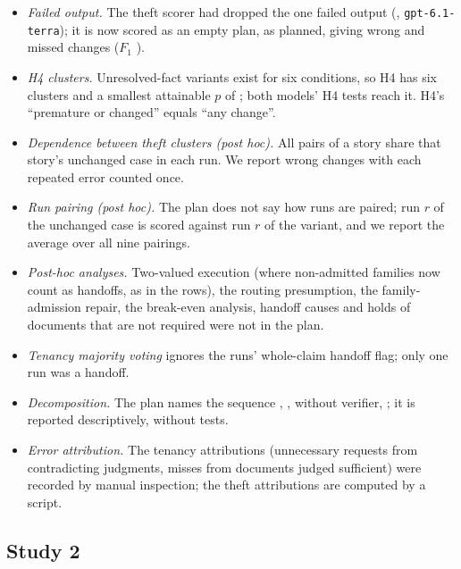 \begin{itemize}[leftmargin=1.2em,itemsep=1pt]
\item \emph{Failed output.} The theft scorer had dropped the one failed output (, \texttt{gpt-6.1-terra}); it is now scored as an empty plan, as planned, giving \thTerraDWrong{} wrong and \thTerraDMissed{} missed changes ($F_1$ \thTerraDFone).
\item \emph{H4 clusters.} Unresolved-fact variants exist for six conditions, so H4 has six clusters and a smallest attainable $p$ of \ptTerraHFourMinP; both models' H4 tests reach it. H4's ``premature or changed'' equals ``any change''.
\item \emph{Dependence between theft clusters (post hoc).} All pairs of a story share that story's unchanged case in each run. We report wrong changes with each repeated error counted once.
\item \emph{Run pairing (post hoc).} The plan does not say how runs are paired; run $r$ of the unchanged case is scored against run $r$ of the variant, and we report the average over all nine pairings.
\item \emph{Post-hoc analyses.} Two-valued execution (where non-admitted families now count as handoffs, as in the \casepath rows), the routing presumption, the family-admission repair, the break-even analysis, handoff causes and holds of documents that are not required were not in the plan.
\item \emph{Tenancy majority voting} ignores the runs' whole-claim handoff flag; only one run was a handoff.
\item \emph{Decomposition.} The plan names the sequence , , \casepath without verifier, \casepath; it is reported descriptively, without tests.
\item \emph{Error attribution.} The tenancy attributions (unnecessary requests from contradicting judgments, misses from documents judged sufficient) were recorded by manual inspection; the theft attributions are computed by a script.
\end{itemize}

\subsection{Study 2}
\label{app:dev-study2}

